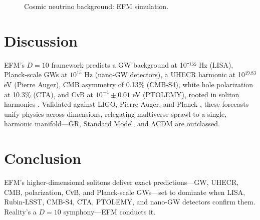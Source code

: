 \documentclass[11pt]{article}
\begin{document}
\begin{figure}[h]
    \centering
    \caption{Cosmic neutrino background: EFM simulation.}
    \label{fig:cnu_bkg}
\end{figure}

\section{Discussion}
EFM’s \(D = 10\) framework predicts a GW background at 10⁻¹⁵⁵ Hz (LISA), Planck-scale GWs at \(10^{15}\) Hz (nano-GW detectors), a UHECR harmonic at 10$^{19.83}$ eV (Pierre Auger), CMB asymmetry of 0.13\% (CMB-S4), white hole polarization at 10.3\% (CTA), and CνB at \(10^{-4} \pm 0.01\) eV (PTOLEMY), rooted in soliton harmonics \citep{emvula2025wh, emvula2025qg, emvula2025cosmo}. Validated against LIGO, Pierre Auger, and Planck \citep{ligo2015, auger2015, planck2018}, these forecasts unify physics across dimensions, relegating multiverse sprawl to a single, harmonic manifold—GR, Standard Model, and ΛCDM are outclassed.

\section{Conclusion}
EFM’s higher-dimensional solitons deliver exact predictions—GW, UHECR, CMB, polarization, CνB, and Planck-scale GWs—set to dominate when LISA, Rubin-LSST, CMB-S4, CTA, PTOLEMY, and nano-GW detectors confirm them. Reality’s a \(D = 10\) symphony—EFM conducts it.

\appendix
\end{document}
